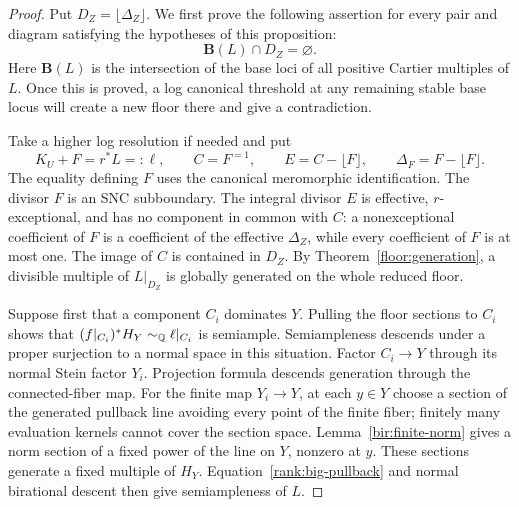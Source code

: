 \begin{proof}
Put \(D_Z=\lfloor\Delta_Z\rfloor\).  We first prove the following assertion
for every pair and diagram satisfying the hypotheses of this proposition:
\begin{equation}
                     \mathbf B(L)\cap D_Z=\varnothing.
\label{rank:floor-avoidance}
\end{equation}
Here \(\mathbf B(L)\) is the intersection of the base loci of all positive
Cartier multiples of \(L\).  Once this is proved, a log canonical threshold
at any remaining stable base locus will create a new floor there and give a
contradiction.

Take a higher log resolution if needed and put
\[
 K_U+F=r^*L=:\ell,\qquad C=F^{=1},\qquad
 E=C-\lfloor F\rfloor,\qquad \Delta_F=F-\lfloor F\rfloor.
\]
The equality defining \(F\) uses the canonical meromorphic
identification.  The divisor \(F\) is an SNC subboundary.
The integral divisor \(E\) is effective, \(r\)-exceptional, and
has no component in common with \(C\): a nonexceptional
coefficient of \(F\) is a coefficient of the effective
\(\Delta_Z\), while every coefficient of \(F\) is at most one.
The image of \(C\) is contained in \(D_Z\).  By
Theorem~\ref{floor:generation}, a divisible multiple of
\(L|_{D_Z}\) is globally generated on the whole reduced floor.

Suppose first that a component \(C_i\) dominates \(Y\).
Pulling the floor sections to \(C_i\) shows that
\((f|_{C_i})^*H_Y\sim_{\mathbb Q}\ell|_{C_i}\) is semiample.  Semiampleness
descends under a proper surjection to a normal space in this
situation.  Factor \(C_i\to Y\) through its normal Stein factor
\(Y_i\).  Projection formula descends generation
through the connected-fiber map.  For the finite map \(Y_i\to Y\),
at each \(y\in Y\) choose a section of the generated pullback line
avoiding every point of the finite fiber; finitely many evaluation
kernels cannot cover the section space.  Lemma~\ref{bir:finite-norm}
gives a norm section of a fixed power of the line on \(Y\), nonzero
at \(y\).  These sections generate a fixed multiple of \(H_Y\).
Equation~\eqref{rank:big-pullback}
and normal birational descent then give semiampleness of \(L\).


\end{proof}
